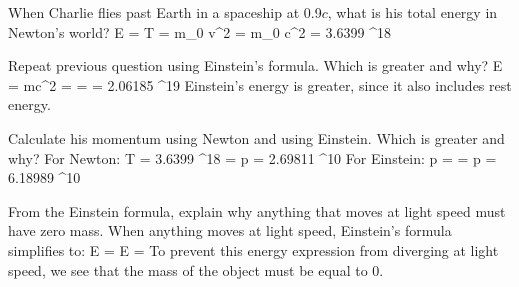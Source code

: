 \item
When Charlie flies past Earth in a spaceship at 0.9$c$, what is his total energy in Newton's world?
\be
E = T =  m_0 v^2 =  m_0 c^2 = 3.6399 ^{18} 
\ee

\item
Repeat previous question using Einstein's formula.  Which is greater and why?
\be
E = mc^2 =  =  = 2.06185 ^{19} 
\ee
Einstein's energy is greater, since it also includes rest energy.

\item
Calculate his momentum using Newton and using Einstein. Which is greater and why?
\newline For Newton:
\be
T = 3.6399 ^{18}  =  \thus p = 2.69811 ^{10} 
\ee
For Einstein:
\be
p =  =  \thus p = 6.18989 ^{10} 
\ee

\item From the Einstein formula, explain why anything that moves at light speed must have zero mass.
\newline When anything moves at light speed, Einstein's formula simplifies to:
\be
E =  \quad {} \quad E = 
\ee
To prevent this energy expression from diverging at light speed, we see that the mass of the object must be equal to $0$.

\enu 
\label{page:end}

\newpage

